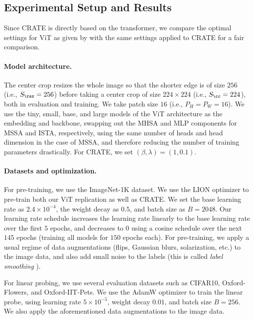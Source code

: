 \documentclass[../../book-main.tex]{subfiles}
\begin{document}
\subsection{Experimental Setup and Results}\label{sub:image_classification_experiments}

Since CRATE is directly based on the transformer, we compare the optimal settings for ViT as given by \cite{dosovitskiy2020image,touvron2020training} with the same settings applied to CRATE for a fair comparison.

\paragraph{Model architecture.} The center crop resizes the whole image so that the shorter edge is of size \(256\) (i.e., \(S_{\rsz} = 256\)) before taking a center crop of size \(224 \times 224\) (i.e., \(S_{\cc} = 224\)), both in evaluation and training. We take patch size \(16\) (i.e., \(P_{H} = P_{W} = 16\)). We use the tiny, small, base, and large models of the ViT \cite{dosovitskiy2020image} architecture as the embedding and backbone, swapping out the MHSA and MLP components for MSSA and ISTA, respectively, using the same number of heads and head dimension in the case of MSSA, and therefore reducing the number of training parameters drastically. For CRATE, we set \((\beta, \lambda) = (1, 0.1)\).

\paragraph{Datasets and optimization.} For pre-training, we use the ImageNet-1K dataset. We use the LION optimizer \citep{chen2024symbolic} to pre-train both our ViT replication as well as CRATE. We set the base learning rate as \(2.4 \times 10^{-4}\), the weight decay as \(0.5\), and batch size as \(B = 2048\). Our learning rate schedule increases the learning rate linearly to the base learning rate over the first \(5\) epochs, and decreases to \(0\) using a cosine schedule over the next \(145\) epochs (training all models for \(150\) epochs each). For pre-training, we apply a usual regime of data augmentations (flips, Gaussian blurs, solarization, etc.) to the image data, and also add small noise to the labels (this is called \textit{label smoothing} \citep{muller2019does}).

For linear probing, we use several evaluation datasets such as CIFAR10, Oxford-Flowers, and Oxford-IIT-Pets. We use the AdamW optimizer to train the linear probe, using learning rate \(5 \times 10^{-5}\), weight decay \(0.01\), and batch size \(B = 256\). We also apply the aforementioned data augmentations to the image data.
\end{document}
